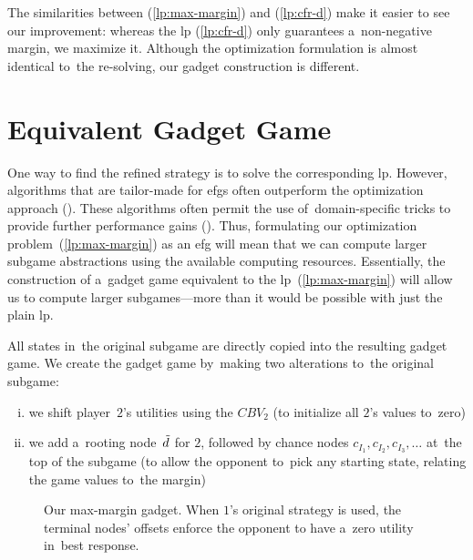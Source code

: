 The similarities between (\ref{lp:max-margin}) and (\ref{lp:cfr-d}) make it easier to see our improvement:
whereas the \acrshort{lp} (\ref{lp:cfr-d}) only guarantees a~non-negative margin, we maximize it.
Although the optimization formulation is almost identical to~the re-solving, our gadget construction is different.

\section{Equivalent Gadget Game}
One way to find the refined strategy is to solve the corresponding \acrfull{lp}.
However, algorithms that are tailor-made for \acrshort{efg}s often outperform the optimization approach (\cite{Bosansky2013solving}).
These algorithms often permit the use of~domain-specific tricks to provide further performance gains (\cite{Johanson2012efficient}).
Thus, formulating our optimization problem~(\ref{lp:max-margin}) as an \acrshort{efg} will mean that we can compute larger subgame abstractions using the available computing resources.
Essentially, the construction of a~gadget game equivalent to the \acrshort{lp}~(\ref{lp:max-margin}) will allow us to compute larger subgames---more than it would be possible with just the plain \acrshort{lp}.

All states in~the original subgame are directly copied into the resulting gadget game.
We create the gadget game by~making two alterations to~the original subgame:
\begin{enumerate}[(i)]
  \item we shift player~$2$'s utilities using the $CBV_2$ (to initialize all $2$'s values to~zero)
  \item we add a~rooting node~$\tilde{d}$ for $2$, followed by chance nodes $c_{I_1}, c_{I_2}, c_{I_3}, \dots$ at~the top of the subgame (to allow the opponent to~pick any starting state, relating the game values to~the margin)
\end{enumerate}

\begin{figure}[H]
  \centering
  \def\svgwidth{.4\textwidth}
  
  \def\captionTitle{Our max-margin gadget}
  \caption[\captionTitle]{\captionTitle. When $1$'s original strategy is used, the terminal nodes' offsets enforce the opponent to have a~zero utility in~best response.}
  \label{fig:max-margin-gadget}
\end{figure}

